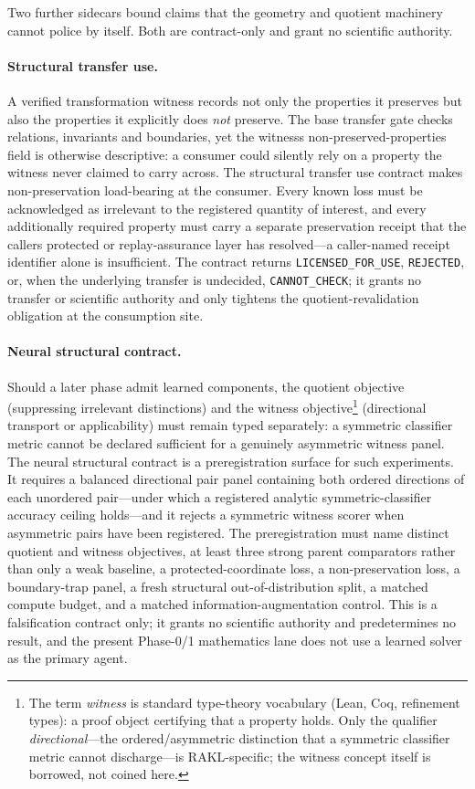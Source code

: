 Two further sidecars bound claims that the geometry and quotient machinery cannot police by itself. Both are contract-only and grant no scientific authority.

\paragraph{Structural transfer use.}
A verified transformation witness records not only the properties it preserves but also the properties it explicitly does \emph{not} preserve. The base transfer gate checks relations, invariants and boundaries, yet the witnesss non-preserved-properties field is otherwise descriptive: a consumer could silently rely on a property the witness never claimed to carry across. The structural transfer use contract makes non-preservation load-bearing at the consumer. Every known loss must be acknowledged as irrelevant to the registered quantity of interest, and every additionally required property must carry a separate preservation receipt that the callers protected or replay-assurance layer has resolved---a caller-named receipt identifier alone is insufficient. The contract returns \texttt{LICENSED\_FOR\_USE}, \texttt{REJECTED}, or, when the underlying transfer is undecided, \texttt{CANNOT\_CHECK}; it grants no transfer or scientific authority and only tightens the quotient-revalidation obligation at the consumption site.

\paragraph{Neural structural contract.}
Should a later phase admit learned components, the quotient objective (suppressing irrelevant distinctions) and the witness objective\footnote{The term \emph{witness} is standard type-theory vocabulary (Lean, Coq, refinement types): a proof object certifying that a property holds. Only the qualifier \emph{directional}---the ordered/asymmetric distinction that a symmetric classifier metric cannot discharge---is RAKL-specific; the witness concept itself is borrowed, not coined here.} (directional transport or applicability) must remain typed separately: a symmetric classifier metric cannot be declared sufficient for a genuinely asymmetric witness panel. The neural structural contract is a preregistration surface for such experiments. It requires a balanced directional pair panel containing both ordered directions of each unordered pair---under which a registered analytic symmetric-classifier accuracy ceiling holds---and it rejects a symmetric witness scorer when asymmetric pairs have been registered. The preregistration must name distinct quotient and witness objectives, at least three strong parent comparators rather than only a weak baseline, a protected-coordinate loss, a non-preservation loss, a boundary-trap panel, a fresh structural out-of-distribution split, a matched compute budget, and a matched information-augmentation control. This is a falsification contract only; it grants no scientific authority and predetermines no result, and the present Phase-0/1 mathematics lane does not use a learned solver as the primary agent.

